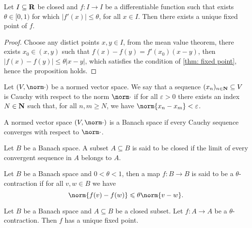 \begin{corollary}
  Let \(I \subseteq \mathbf{R}\) be closed and \(f : I \to I\) be a
  differentiable function such that exists \(\theta \in [0, 1)\) for which
  \(|f'(x)| \leq \theta\), for all \(x \in I\). Then there exists a unique fixed
  point of \(f\).
\end{corollary}

\begin{proof}
  Choose any distict points \(x, y \in I\), from the mean value theorem, there
  exists \(x_0 \in (x, y)\) such that \(f(x) - f(y) = f'(x_0)(x - y)\), then
  \(|f(x) - f(y)| \leq \theta |x - y|\), which satisfies the condition of
  \cref{thm: fixed point}, hence the proposition holds.
\end{proof}

\begin{definition}
Let \((V, \norm \cdot)\) be a normed vector space. We say that a sequence
\((x_n)_{n \in \mathbf{N}} \subseteq V\) is Cauchy with respect to the norm \(\norm \cdot\) if for all
\(\varepsilon > 0\) there exists an index \(N \in \mathbf{N}\) such that, for all \(n, m \geq N\), we
have \(\norm{x_n - x_m} < \varepsilon\).
\end{definition}


\begin{definition}\label{def: Banach space}
  A normed vector space \((V, \norm \cdot)\) is a Banach space if every Cauchy
  sequence converges with respect to \(\norm \cdot\).
\end{definition}

\begin{definition}
  Let \(B\) be a Banach space. A subset \(A \subseteq B\) is said to be closed
  if the limit of every convergent sequence in \(A\) belongs to \(A\).
\end{definition}

\begin{definition}[Contraction]
\label{def:contraction}
  Let \(B\) be a Banach space and \(0 < \theta < 1\), then a map \(f: B \to B\)
  is said to be a \(\theta\)-contraction if for all \(v, w \in B\) we have
  \[
    \norm{f(v) - f(w)} \leq \theta \norm{v - w}.
  \]
\end{definition}

\begin{theorem}\label{thm: Banach fixed point}
  Let \(B\) be a Banach space and \(A \subseteq B\) be a closed subset. Let \(f:
  A \to A\) be a \(\theta\)-contraction. Then \(f\) has a unique fixed point.
\end{theorem}

